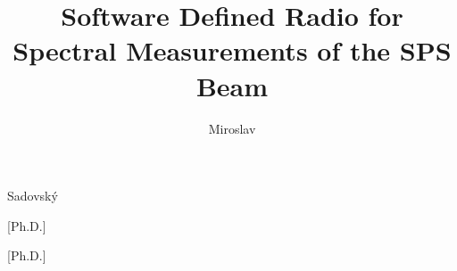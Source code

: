 
\usepackage[
  english,			%
	semestral,		%
  center,			%
%
]{thesis}   %


\author[]{Miroslav}{Sadovský}


[Ph.D.]

[Ph.D.]

\title{Software Defined Radio for Spectral Measurements of the SPS Beam}

